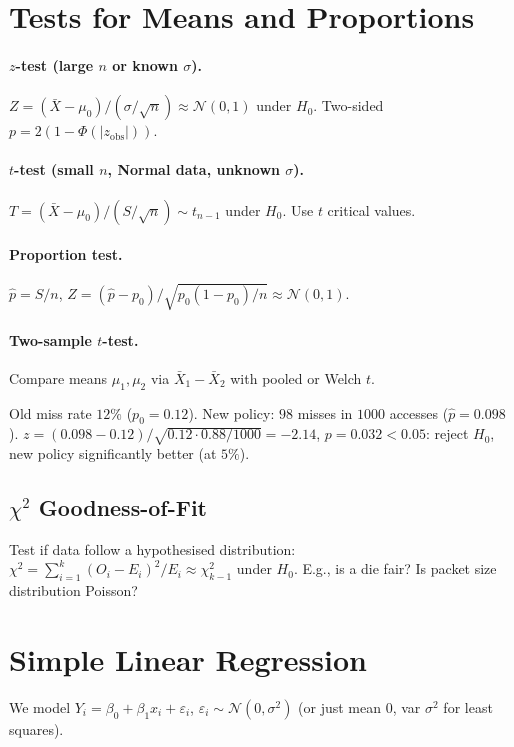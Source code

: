 \section{Tests for Means and Proportions}
\label{sec:tests-means}

\paragraph{$z$-test (large $n$ or known $\sigma$).} $Z=(\bar X-\mu_0)/(\sigma/\sqrt{n})\approx\mathcal{N}(0,1)$ under $H_0$. Two-sided $p=2(1-\Phi(|z_{\text{obs}}|))$.

\paragraph{$t$-test (small $n$, Normal data, unknown $\sigma$).} $T=(\bar X-\mu_0)/(S/\sqrt{n})\sim t_{n-1}$ under $H_0$. Use $t$ critical values.

\paragraph{Proportion test.} $\hat p=S/n$, $Z=(\hat p-p_0)/\sqrt{p_0(1-p_0)/n}\approx\mathcal{N}(0,1)$.

\paragraph{Two-sample $t$-test.} Compare means $\mu_1,\mu_2$ via $\bar X_1-\bar X_2$ with pooled or Welch $t$.

\begin{example} Old miss rate $12\%$ ($p_0=0.12$). New policy: $98$ misses in $1000$ accesses ($\hat p=0.098$). $z=(0.098-0.12)/\sqrt{0.12\cdot0.88/1000}=-2.14$, $p=0.032<0.05$: reject $H_0$, new policy significantly better (at $5\%$).
\end{example}

\subsection{$\chi^2$ Goodness-of-Fit}
Test if data follow a hypothesised distribution: $\chi^2=\sum_{i=1}^k(O_i-E_i)^2/E_i\approx\chi^2_{k-1}$ under $H_0$. E.g., is a die fair? Is packet size distribution Poisson?

\section{Simple Linear Regression}
\label{sec:regression}
We model $Y_i=\beta_0+\beta_1 x_i+\varepsilon_i$, $\varepsilon_i\sim\mathcal{N}(0,\sigma^2)$ (or just mean $0$, var $\sigma^2$ for least squares).

